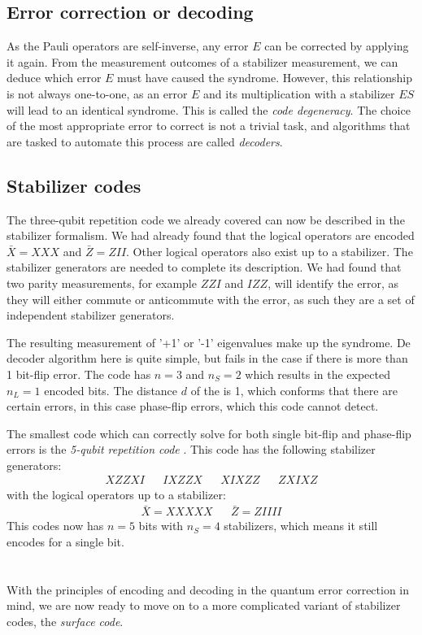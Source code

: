 \subsection{Error correction or decoding}

As the Pauli operators are self-inverse, any error $E$ can be corrected by applying it again. From the measurement outcomes of a stabilizer measurement, we can deduce which error $E$ must have caused the syndrome. However, this relationship is not always one-to-one, as an error $E$ and its multiplication with a stabilizer $ES$ will lead to an identical syndrome. This is called the \emph{code degeneracy}. The choice of the most appropriate error to correct is not a trivial task, and algorithms that are tasked to automate this process are called \emph{decoders}.

\subsection{Stabilizer codes}

The three-qubit repetition code we already covered can now be described in the stabilizer formalism. We had already found that the logical operators are encoded $\bar{X} = XXX$ and $\bar{Z} = ZII$. Other logical operators also exist up to a stabilizer. The stabilizer generators are needed to complete its description. We had found that two parity measurements, for example $ZZI$ and $IZZ$, will identify the error, as they will either commute or anticommute with the error, as such they are a set of independent stabilizer generators. 

The resulting measurement of '+1' or '-1' eigenvalues make up the syndrome. De decoder algorithm here is quite simple, but fails in the case if there is more than 1 bit-flip error. The code has $n=3$ and $n_S=2$ which results in the expected $n_L = 1$ encoded bits. The distance $d$ of the is 1, which conforms that there are certain errors, in this case phase-flip errors, which this code cannot detect.

The smallest code which can correctly solve for both single bit-flip and phase-flip errors is the \emph{5-qubit repetition code} \cite{laflamme1996perfect}. This code has the following stabilizer generators:
\begin{align}
  XZZXI && IXZZX && XIXZZ && ZXIXZ
\end{align}
with the logical operators up to a stabilizer:
\begin{align}
  & \bar{X} = XXXXX && \bar{Z} = ZIIII &
\end{align}
This codes now has $n=5$ bits with $n_S = 4$ stabilizers, which means it still encodes for a single bit.\\
\\
\\
With the principles of encoding and decoding in the quantum error correction in mind, we are now ready to move on to a more complicated variant of stabilizer codes, the \emph{surface code}. 


